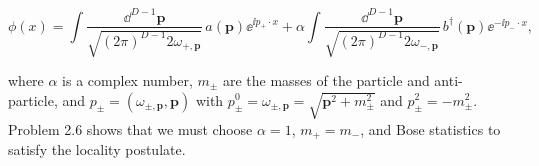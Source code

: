 \[
\phi(x)=\int\frac{\dd^{D-1}\mathbf p}{\sqrt{(2\pi)^{D-1} 2\omega_{+,\mathbf p}}}\,a(\mathbf p)\ee^{\ii p_+\mathbin{\cdot}x}
+\alpha\int\frac{\dd^{D-1}\mathbf p}{\sqrt{(2\pi)^{D-1} 2\omega_{-,\mathbf p}}}\,b^\dagger(\mathbf p)\ee^{-\ii p_-\mathbin{\cdot}x},
\]

where $\alpha$ is a complex number, $m_\pm$ are the masses of the particle and anti-particle, and
$p_\pm=(\omega_{\pm,\mathbf p},\mathbf p)$ with $p_\pm^0=\omega_{\pm,\mathbf p}=\sqrt{\mathbf p^2+m_\pm^2}$ and $p_\pm^2=-m_\pm^2$.
Problem 2.6 shows that we must choose $\alpha=1$, $m_+=m_-$, and Bose statistics to satisfy the
locality postulate.
